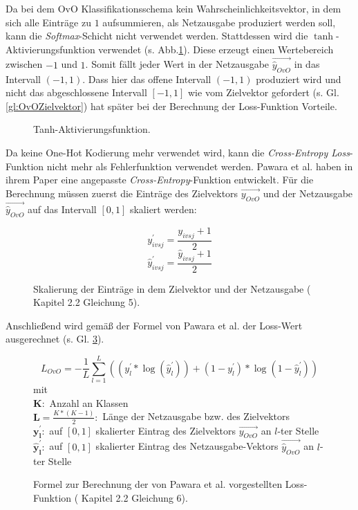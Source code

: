 Da bei dem OvO Klassifikationsschema kein Wahrscheinlichkeitsvektor, in dem sich alle Einträge zu $1$ aufsummieren, als Netzausgabe produziert werden soll, kann die \textit{Softmax}-Schicht nicht verwendet werden. Stattdessen wird die $\tanh$-Aktivierungsfunktion verwendet (s. Abb.\ref{fig:tanh}). Diese erzeugt einen Wertebereich zwischen $-1$ und $1$. Somit fällt jeder Wert in der Netzausgabe $\overrightarrow{\widehat{y}_{OvO}}$ in das Intervall $(-1, 1)$. Dass hier das offene Intervall $(-1, 1)$ produziert wird und nicht das abgeschlossene Intervall $[-1, 1]$ wie vom Zielvektor gefordert (s. Gl. \ref{gl:OvOZielvektor}) hat später bei der Berechnung der Loss-Funktion Vorteile.

\begin{figure}[H]
\begin{adjustbox}{width=.65\textwidth, center}

\end{adjustbox}
\caption{Tanh-Aktivierungsfunktion.}
\label{fig:tanh}
\end{figure}

Da keine One-Hot Kodierung mehr verwendet wird, kann die \textit{Cross-Entropy Loss}-Funktion nicht mehr als Fehlerfunktion verwendet werden. Pawara et al. haben in ihrem Paper \cite{pawaraPaper} eine angepasste \textit{Cross-Entropy}-Funktion entwickelt. Für die Berechnung müssen zuerst die Einträge des Zielvektors $\overrightarrow{y_{OvO}}$ und der Netzausgabe $\overrightarrow{\widehat{y}_{OvO}}$ auf das Intervall $[0, 1]$ skaliert werden:
\begin{figure}[H]
\[y_{ivsj}^{'} = \frac{y_{ivsj} + 1}{2}\]
\[\widehat{y}_{ivsj}^{'} = \frac{\widehat{y}_{ivsj} + 1}{2}\]
\caption{Skalierung der Einträge in dem Zielvektor und der Netzausgabe (\cite{pawaraPaper} Kapitel 2.2 Gleichung 5).}
\label{gl:pawaraSkalierung}
\end{figure}

Anschließend wird gemäß der Formel von Pawara et al. der Loss-Wert ausgerechnet (s. Gl. \ref{gl:pawaraLoss}).

\begin{figure}[H]
\[L_{OvO} = - \frac{1}{L} \sum_{l=1}^{L}((y_{l}^{'} * \log{(\widehat{y}_{l}^{'})}) + (1 - y_{l}^{'}) * \log{(1-\widehat{y}_{l}^{'})})\]
mit\\
$\boldsymbol{K}:$ Anzahl an Klassen\\

$\boldsymbol{L}=\frac{K*(K-1)}{2}:$ Länge der Netzausgabe bzw. des Zielvektors\\

$\boldsymbol{y_{l}^{'}}:$ auf $[0, 1]$ skalierter Eintrag des Zielvektors $\overrightarrow{y_{OvO}}$ an $l$-ter Stelle\\

$\boldsymbol{\widehat{y}_{l}^{'}}:$ auf $[0, 1]$ skalierter Eintrag des Netzausgabe-Vektors $\overrightarrow{\widehat{y}_{OvO}}$ an $l$-ter Stelle\\


\caption{Formel zur Berechnung der von Pawara et al. vorgestellten Loss-Funktion (\cite{pawaraPaper} Kapitel 2.2 Gleichung 6).}
\label{gl:pawaraLoss}
\end{figure}


